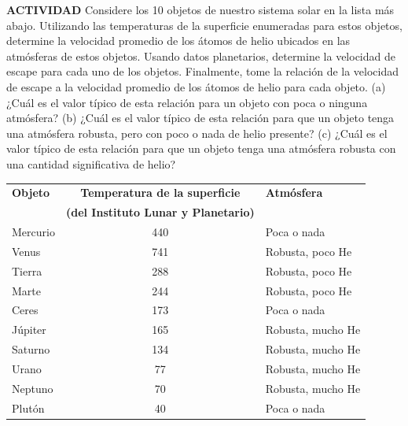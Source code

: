 \item \textbf{ACTIVIDAD} Considere los 10 objetos de nuestro sistema solar en la lista más abajo. Utilizando las temperaturas de la superficie enumeradas para estos objetos, determine la velocidad promedio de los átomos de helio ubicados en las atmósferas de estos objetos. Usando datos planetarios, determine la velocidad de escape para cada uno de los objetos. Finalmente, tome la relación de la velocidad de escape a la velocidad promedio de los átomos de helio para cada objeto. (a) ¿Cuál es el valor típico de esta relación para un objeto con poca o ninguna atmósfera? (b) ¿Cuál es el valor típico de esta relación para que un objeto tenga una atmósfera robusta, pero con poco o nada de helio presente? (c) ¿Cuál es el valor típico de esta relación para que un objeto tenga una atmósfera robusta con una cantidad significativa de helio?

\begin{center}
\begin{tabular}{|l|c|l|}
\hline
\textbf{Objeto} & \textbf{Temperatura de la superficie} & \textbf{Atmósfera} \\ 
 & \textbf{(del Instituto Lunar y Planetario)} & \\ \hline
Mercurio & 440 & Poca o nada \\
Venus & 741 & Robusta, poco He \\
Tierra & 288 & Robusta, poco He \\
Marte & 244 & Robusta, poco He \\
Ceres & 173 & Poca o nada \\
Júpiter & 165 & Robusta, mucho He \\
Saturno & 134 & Robusta, mucho He \\
Urano & 77 & Robusta, mucho He \\
Neptuno & 70 & Robusta, mucho He \\
Plutón & 40 & Poca o nada \\ \hline
\end{tabular}
\end{center}
